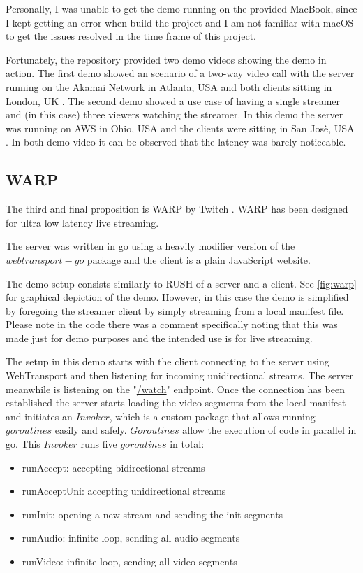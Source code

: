 \documentclass[conference]{IEEEtran}
\begin{document}
Personally, I was unable to get the demo running on the provided MacBook, since I kept getting an error when build the project and I am not familiar with macOS to get the issues resolved in the time frame of this project.

Fortunately, the repository provided two demo videos showing the demo in action. The first demo showed an scenario of a two-way video call with the server running on the Akamai Network in Atlanta, USA and both clients sitting in London, UK \cite{b23}. The second demo showed a use case of having a single streamer and (in this case) three viewers watching the streamer. In this demo the server was running on AWS in Ohio, USA and the clients were sitting in San Josè, USA \cite{b24}. In both demo video it can be observed that the latency was barely noticeable.

\subsection{WARP}
The third and final proposition is WARP by Twitch \cite{b25}. WARP has been designed for ultra low latency live streaming.

The server was written in go using a heavily modifier version of the $webtransport-go$ package \cite{b26} and the client is a plain JavaScript website. 

The demo setup consists similarly to RUSH of a server and a client. See \cref{fig:warp} for graphical depiction of the demo. However, in this case the demo is simplified by foregoing the streamer client by simply streaming from a local manifest file. Please note in the code there was a comment specifically noting that this was made just for demo purposes and the intended use is for live streaming. 

The setup in this demo starts with the client connecting to the server using WebTransport and then listening for incoming unidirectional streams. The server meanwhile is listening on the "\url{/watch}" endpoint. Once the connection has been established the server starts loading the video segments from the local manifest and initiates an $Invoker$, which is a custom package that allows running $goroutines$ easily and safely. $Goroutines$ allow the execution of code in parallel in go. This $Invoker$ runs five $goroutines$ in total:

\begin{itemize}
    \item runAccept: accepting bidirectional streams
    \item runAcceptUni: accepting unidirectional streams
    \item runInit: opening a new stream and sending the init segments
    \item runAudio: infinite loop, sending all audio segments
    \item runVideo: infinite loop, sending all video segments
\end{itemize}
\end{document}
